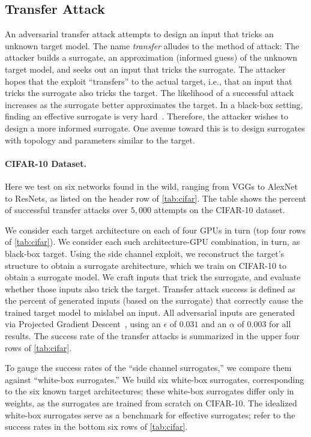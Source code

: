 \documentclass[12pt]{report}
\begin{document}
\subsection{Transfer Attack}\label{sec:transferability}
An adversarial transfer attack attempts to design an input that tricks an unknown target model. The name 
\emph{transfer} alludes to the method of attack: The attacker builds a surrogate, an approximation (informed guess) of the unknown target model, and seeks out an input that tricks the surrogate. The attacker hopes that the exploit ``transfers'' to the actual target, i.e., that an input that tricks the surrogate also tricks the target. 
The likelihood of a successful attack increases as the surrogate better approximates the target. In a black-box setting, finding an effective surrogate is very hard~\cite{demontis2019adversarial}. 
Therefore, the attacker wishes to design a more informed surrogate. One avenue toward this is to design surrogates with topology and parameters similar to the target.

\paragraph{CIFAR-10 Dataset.}
Here we test on six networks found in the wild, 
ranging from VGGs to AlexNet to ResNets, as listed on the header row of
\ref{tab:cifar}. The table shows the percent of successful transfer 
attacks over $5,000$ attempts on the CIFAR-10 dataset.

We consider each target architecture on each of four GPUs in turn (top four rows of \ref{tab:cifar}). 
We consider each such architecture-GPU combination, in turn, as black-box target. 
Using the side channel exploit, we reconstruct the target's structure to 
obtain a surrogate architecture, 
which we train on CIFAR-10 to obtain a surrogate model. 
We craft inputs that trick the surrogate, and evaluate whether those inputs also trick the target. 
Transfer attack success is defined as the percent of generated inputs (based on the surrogate) that correctly cause the trained target model to mislabel an input.
All adversarial inputs are generated via Projected Gradient Descent~\cite{madry2018towards}, using an $\epsilon$ of $0.031$ and an $\alpha$ of $0.003$ for all results.
The success rate of the transfer attacks is summarized in the upper four rows of \ref{tab:cifar}. 

To gauge the success rates of the ``side channel surrogates,'' we compare them against ``white-box surrogates.'' We build six white-box surrogates, corresponding to the six known target architectures; these white-box surrogates differ only in weights, as the surrogates are trained from scratch on CIFAR-10.
The idealized white-box surrogates serve as a benchmark for effective surrogates; refer to the success rates in the bottom six rows of \ref{tab:cifar}.
\end{document}
